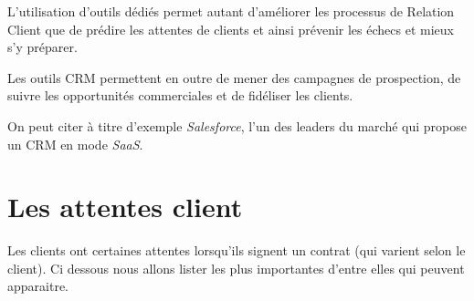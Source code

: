         L'utilisation d'outils dédiés permet autant d'améliorer les processus de Relation Client que de prédire les attentes de clients et ainsi prévenir les échecs et mieux s'y préparer.

        Les outils CRM permettent en outre de mener des campagnes de prospection, de suivre les opportunités commerciales et de fidéliser les clients.

        On peut citer à titre d'exemple \textit{Salesforce}, l'un des leaders du marché qui propose un CRM en mode \textit{SaaS}.




\section{Les attentes client}

	Les clients ont certaines attentes lorsqu'ils signent un contrat (qui varient selon le client). Ci dessous nous allons lister les plus importantes d'entre elles qui peuvent apparaitre.

